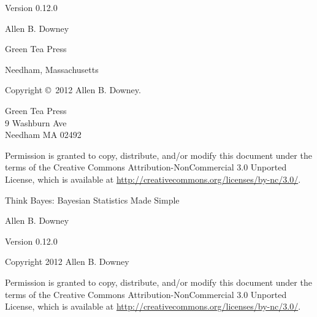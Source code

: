 \documentclass[12pt]{book}
\newcommand{\thetitle}{Think Bayes: Bayesian Statistics Made Simple}
\newcommand{\theversion}{0.12.0}
\begin{document}
\begin{latexonly}
\begin{flushright}
Version \theversion

\vspace{1in}


{\Large
Allen B. Downey\\
}


\vspace{0.5in}

{\Large Green Tea Press}

{\small Needham, Massachusetts}

\vfill

\end{flushright}


\pagebreak
\thispagestyle{empty}

Copyright \copyright ~2012 Allen B. Downey.


\vspace{0.2in}

\begin{flushleft}
Green Tea Press       \\
9 Washburn Ave \\
Needham MA 02492
\end{flushleft}

Permission is granted to copy, distribute, and/or modify this document
under the terms of the Creative Commons Attribution-NonCommercial 3.0 Unported
License, which is available at \url{http://creativecommons.org/licenses/by-nc/3.0/}.

\vspace{0.2in}

\end{latexonly}



\begin{htmlonly}


{\Large \thetitle}

{\large Allen B. Downey}

Version \theversion

\vspace{0.25in}

Copyright 2012 Allen B. Downey

\vspace{0.25in}

Permission is granted to copy, distribute, and/or modify this document
under the terms of the Creative Commons Attribution-NonCommercial 3.0
Unported License, which is available at
\url{http://creativecommons.org/licenses/by-nc/3.0/}.

\setcounter{chapter}{-1}

\end{htmlonly}
\end{document}
